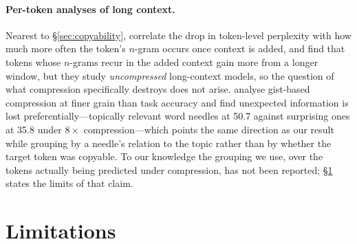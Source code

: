 \documentclass[11pt]{article}
\begin{document}
\paragraph{Per-token analyses of long context.}
Nearest to \S\ref{sec:copyability}, \citet{tokensbenefit} correlate the drop in
token-level perplexity with how much more often the token's $n$-gram occurs once
context is added, and find that tokens whose $n$-grams recur in the added context
gain more from a longer window, but they study \emph{uncompressed} long-context
models, so the question of what compression specifically destroys does not arise. \citet{gistboundary} analyse
gist-based compression at finer grain than task accuracy and find unexpected
information is lost preferentially---topically relevant word needles at 50.7
against surprising ones at 35.8 under $8\times$ compression---which points the
same direction as our result while grouping by a needle's relation to the topic
rather than by whether the target token was copyable. To our knowledge the
grouping we use, over the tokens actually being predicted under compression, has
not been reported; \S\ref{sec:limitations} states the limits of that claim.

\section{Limitations}
\label{sec:limitations}
\end{document}

